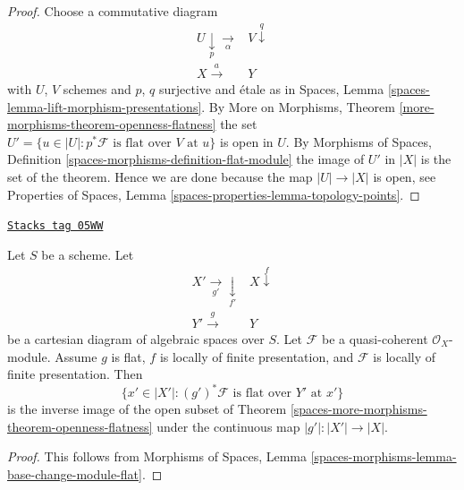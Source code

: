 \begin{proof}
Choose a commutative diagram
$$
\begin{array}{cc}U \underset{p}{\downarrow}\underset{\alpha}{\longrightarrow} & V \overset{q}{\downarrow} \\ X \overset{a}{\longrightarrow} & Y\end{array}
$$
with $U$, $V$ schemes and $p$, $q$ surjective and \'etale as in
Spaces, Lemma \ref{spaces-lemma-lift-morphism-presentations}.
By
More on Morphisms, Theorem \ref{more-morphisms-theorem-openness-flatness}
the set
$U' = \{u \in |U| : p^*\mathcal{F}\text{ is flat over }V\text{ at }u\}$
is open in $U$. By
Morphisms of Spaces, Definition \ref{spaces-morphisms-definition-flat-module}
the image of $U'$ in $|X|$ is the set
of the theorem. Hence we are done because the map $|U| \to |X|$ is
open, see
Properties of Spaces, Lemma \ref{spaces-properties-lemma-topology-points}.
\end{proof}

\begin{lemma}
\label{spaces-more-morphisms-lemma-flat-locus-base-change}
\href{https://stacks.math.columbia.edu/tag/05WW}{\texttt{Stacks tag 05WW}}

Let $S$ be a scheme. Let
$$
\begin{array}{cc}X' \underset{g'}{\longrightarrow}\underset{f'}{\downarrow} & X \overset{f}{\downarrow} \\ Y' \overset{g}{\longrightarrow} & Y\end{array}
$$
be a cartesian diagram of algebraic spaces over $S$.
Let $\mathcal{F}$ be a quasi-coherent $\mathcal{O}_X$-module.
Assume $g$ is flat, $f$ is locally of finite presentation,
and $\mathcal{F}$ is locally of finite presentation.
Then
$$
\{x' \in |X'| : (g')^*\mathcal{F}\text{ is flat over }Y'\text{ at }x'\}
$$
is the inverse image of the open subset of
Theorem \ref{spaces-more-morphisms-theorem-openness-flatness}
under the continuous map $|g'| : |X'| \to |X|$.
\end{lemma}

\begin{proof}
This follows from
Morphisms of Spaces, Lemma
\ref{spaces-morphisms-lemma-base-change-module-flat}.
\end{proof}

